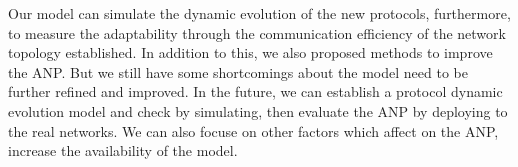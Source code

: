 \documentclass{article}
\begin{document}
Our model can simulate the dynamic evolution of the new protocols, furthermore, to measure the adaptability through the
communication efficiency of the network topology established. In addition to this, we also proposed methods to improve
the ANP. But we still have some shortcomings about the model need to be further refined and improved. In the future,
we can establish a protocol dynamic evolution model and check by simulating,  then evaluate the ANP by deploying to
the real networks. We can also focuse on other factors which affect on the ANP, increase the availability of the model.
\end{document}
